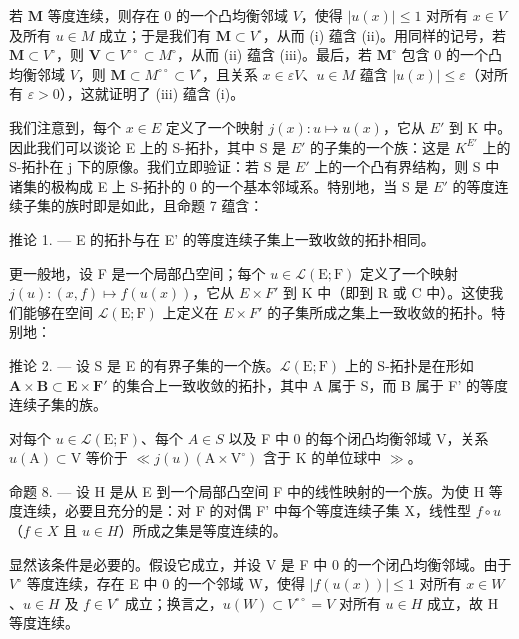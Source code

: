 若 \(\mathbf{M}\) 等度连续，则存在 0 的一个凸均衡邻域 \(V\)，使得 \(|u(x)| \leqslant 1\) 对所有 \(x \in V\) 及所有 \(u \in M\) 成立；于是我们有 \(\mathbf{M} \subset V^{\circ}\)，从而 (i) 蕴含 (ii)。用同样的记号，若 \(\mathbf{M} \subset V^{\circ}\)，则 \(\mathbf{V} \subset V^{\circ \circ} \subset M^{\circ}\)，从而 (ii) 蕴含 (iii)。最后，若 \(\mathbf{M}^{\circ}\) 包含 0 的一个凸均衡邻域 \(V\)，则 \(\mathbf{M} \subset M^{\circ \circ} \subset V^{\circ}\)，且关系 \(x \in \varepsilon V\)、\(u \in M\) 蕴含 \(|u(x)| \leqslant \varepsilon\)（对所有 \(\varepsilon > 0\)），这就证明了 (iii) 蕴含 (i)。

我们注意到，每个 \(x \in E\) 定义了一个映射 \(j(x): u \mapsto u(x)\)，它从 \(E'\) 到 K 中。因此我们可以谈论 E 上的 S-拓扑，其中 S 是 \(E'\) 的子集的一个族：这是 \(K^{E'}\) 上的 S-拓扑在 j 下的原像。我们立即验证：若 S 是 \(E'\) 上的一个凸有界结构，则 S 中诸集的极构成 E 上 S-拓扑的 0 的一个基本邻域系。特别地，当 S 是 \(E'\) 的等度连续子集的族时即是如此，且命题 7 蕴含：

推论 1. --- E 的拓扑与在 E' 的等度连续子集上一致收敛的拓扑相同。

更一般地，设 F 是一个局部凸空间；每个 \(u \in \mathcal{L}(\mathrm{E}; \mathrm{F})\) 定义了一个映射 \(j(u):(x, f) \mapsto f(u(x))\)，它从 \(E \times F'\) 到 K 中（即到 R 或 C 中）。这使我们能够在空间 \(\mathcal{L}(\mathrm{E}; \mathrm{F})\) 上定义在 \(E \times F'\) 的子集所成之集上一致收敛的拓扑。特别地：

推论 2. --- 设 S 是 E 的有界子集的一个族。\(\mathcal{L}(\mathrm{E};\mathrm{F})\) 上的 S-拓扑是在形如 \(\mathbf{A}\times\mathbf{B}\subset\mathbf{E}\times\mathbf{F}'\) 的集合上一致收敛的拓扑，其中 A 属于 S，而 B 属于 F' 的等度连续子集的族。

对每个 \(u \in \mathcal{L}(\mathrm{E}; \mathrm{F})\)、每个 \(A \in S\) 以及 F 中 0 的每个闭凸均衡邻域 V，关系 \(u(\mathrm{A}) \subset \mathrm{V}\) 等价于 \(\ll j(u) (\mathrm{A} \times \mathrm{V}^{\circ})\) 含于 K 的单位球中 \(\gg\)。

命题 8. --- 设 H 是从 E 到一个局部凸空间 F 中的线性映射的一个族。为使 H 等度连续，必要且充分的是：对 F 的对偶 F' 中每个等度连续子集 X，线性型 \(f \circ u\)（\(f \in X\) 且 \(u \in H\)）所成之集是等度连续的。

显然该条件是必要的。假设它成立，并设 V 是 F 中 0 的一个闭凸均衡邻域。由于 \(V^{\circ}\) 等度连续，存在 E 中 0 的一个邻域 W，使得 \(\left|f(u(x))\right| \leqslant 1\) 对所有 \(x \in W\)、\(u \in H\) 及 \(f \in V^{\circ}\) 成立；换言之，\(u(W) \subset V^{\circ\circ} = V\) 对所有 \(u \in H\) 成立，故 H 等度连续。

